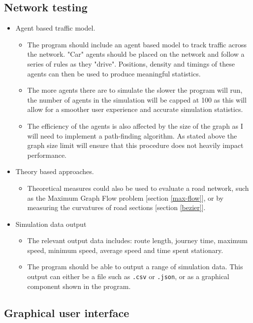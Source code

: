     \subsection{Network testing}
    \begin{itemize}
        \item Agent based traffic model.
        \begin{itemize}
            \item The program should include an agent based model to track traffic across the network. "Car" agents should be placed on the network and follow a series of rules as they "drive". Positions, density and timings of these agents can then be used to produce meaningful statistics.
            \item The more agents there are to simulate the slower the program will run, the number of agents in the simulation will be capped at 100 as this will allow for a smoother user experience and accurate simulation statistics.
            \item The efficiency of the agents is also affected by the size of the graph as I will need to implement a path-finding algorithm. As stated above the graph size limit will ensure that this procedure does not heavily impact performance.
        \end{itemize}
        \item Theory based approaches.
        \begin{itemize}
            \item Theoretical measures could also be used to evaluate a road network, such as the Maximum Graph Flow problem [section \ref{max-flow}], or by measuring the curvatures of road sections [section \ref{bezier}].
        \end{itemize}
        \item Simulation data output
        \begin{itemize}
            \item The relevant output data includes: route length, journey time, maximum speed, minimum speed, average speed and time spent stationary. 
            \item The program should be able to output a range of simulation data. This output can either be a file such as \texttt{.csv} or \texttt{.json}, or as a graphical component shown in the program.
        \end{itemize}
    \end{itemize}

    \subsection{Graphical user interface}
    \label{requirements-GUI}

